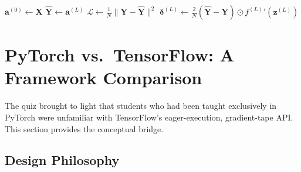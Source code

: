 \documentclass[12pt,a4paper]{article}
\newcommand{\loss}{\mathcal{L}}
\begin{document}
\begin{algorithm}[htbp]
  \DontPrintSemicolon
  \caption{Backpropagation with Gradient-Norm Monitoring}
  \label{alg:backprop}
  \BlankLine
  $\mathbf{a}^{(0)} \leftarrow \mathbf{X}$\;
  $\hat{\mathbf{Y}} \leftarrow \mathbf{a}^{(L)}$\;
  $\loss \leftarrow \frac{1}{N}\|\mathbf{Y} - \hat{\mathbf{Y}}\|^2$\;
  \BlankLine
  $\boldsymbol{\delta}^{(L)} \leftarrow \frac{2}{N}(\hat{\mathbf{Y}} - \mathbf{Y}) \odot {f^{(L)}}'(\mathbf{z}^{(L)})$\;
  \BlankLine
  \;
\end{algorithm}

\section{PyTorch vs.\ TensorFlow: A Framework Comparison}
\label{sec:frameworks}

The quiz brought to light that students who had been taught exclusively
in PyTorch were unfamiliar with TensorFlow's eager-execution,
gradient-tape API.  This section provides the conceptual bridge.

\subsection{Design Philosophy}
\label{ssec:design}
\end{document}
